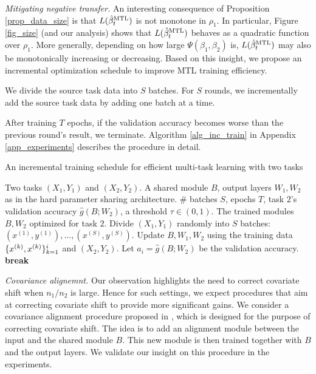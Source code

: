\noindent\textit{Mitigating negative transfer.}
An interesting consequence of Proposition \ref{prop_data_size} is that $L(\hat{\beta}_t^{\textup{MTL}})$ is not monotone in $\rho_1$.
In particular, Figure \ref{fig_size} (and our analysis) shows that $L(\hat{\beta}_t^{\textup{MTL}})$ behaves as a quadratic function over $\rho_1$.
More generally, depending on how large $\Psi(\beta_1, \beta_2)$ is, $L(\hat{\beta}_t^{\textup{MTL}})$ may also be monotonically increasing or decreasing.
Based on this insight, we propose an incremental optimization schedule to improve MTL training efficiency.
\squishlist
	\item We divide the source task data into $S$ batches.
	For $S$ rounds, we incrementally add the source task data by adding one batch at a time.
	\item After training $T$ epochs, if the validation accuracy becomes worse than the previous round's result, we terminate.
	Algorithm \ref{alg_inc_train} in Appendix \ref{app_experiments} describes the procedure in detail.
\squishend

\begin{algorithm}[!t]
	\caption{An incremental training schedule for efficient multi-task learning with two tasks}
	\label{alg_inc_train}
	\begin{algorithmic}[1]
		\Input Two tasks $(X_1, Y_1)$ and $(X_2, Y_2)$.
		\Param A shared module $B$, output layers $W_1, W_2$ as in the hard parameter sharing architecture.
		\Req \# batches $S$, epochs $T$, task $2$'s validation accuracy $\hat{g}(B; W_2)$, a threshold $\tau\in(0,1)$.
		\Output The trained modules $B, W_2$ optimized for task $2$.
		\State Divide $(X_1, Y_1)$ randomly into $S$ batches: $(x^{(1)}, y^{(1)}), \dots, (x^{(S)}, y^{(S)})$.
				\State Update $B, W_1, W_2$ using the training data $\{x^{(k)}, x^{(k)}\}_{k=1}^i$ and  $(X_2, Y_2)$.
			\EndFor
			\State Let $a_i = \hat{g}(B; W_2)$ be the validation accuracy.
				\State \textbf{break}
			\EndIf
		\EndFor
	\end{algorithmic}
\end{algorithm}

\noindent\textit{Covariance alignemnt.}
Our observation highlights the need to correct covariate shift when $n_1 / n_2$ is large.
Hence for such settings, we expect procedures that aim at correcting covariate shift to provide more significant gains.
We consider a covariance alignment procedure proposed in \cite{WZR20}, which is designed for the purpose of correcting covariate shift.
The idea is to add an alignment module between the input and the shared module $B$.
This new module is then trained together with $B$ and the output layers.
We validate our insight on this procedure in the experiments.

